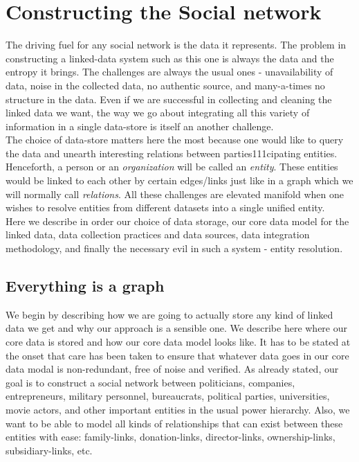 \chapter{Constructing the Social network}
The driving fuel for any social network is the data it represents. The problem in constructing a linked-data system such as this one is always the data and the entropy it brings. The challenges are always the usual ones - unavailability of data, noise in the collected data, no authentic source, and many-a-times no structure in the data. Even if we are successful in collecting and cleaning the linked data we want, the way we go about integrating all this variety of information in a single data-store is itself an another challenge. \\

The choice of data-store matters here the most because one would like to query the data and unearth interesting relations between parties111cipating entities. Henceforth, a person or an \emph{organization} will be called an \emph{entity}. These entities would be linked to each other by certain edges/links just like in a graph which we will normally call \emph{relations}. All these challenges are elevated manifold when one wishes to resolve entities from different datasets into a single unified entity. \\

Here we describe in order our choice of data storage, our core data model for the linked data, data collection practices and data sources, data integration methodology, and finally the necessary evil in such a system -  entity resolution. \\

\section{Everything is a graph}
\label{datamodel}
We begin by describing how we are going to actually store any kind of linked data we get and why our approach is a sensible one. We describe here where our core data is stored and how our core data model looks like. It has to be stated at the onset that care has been taken to ensure that
whatever data goes in our core data modal is non-redundant, free of noise and verified. As already stated, our goal is to construct a social network between politicians, companies, entrepreneurs, military personnel, bureaucrats, political parties, universities, movie actors, and other important entities in the usual power hierarchy. Also, we want to be able to model all kinds of relationships that can exist between these entities with ease: family-links, donation-links, director-links, ownership-links, subsidiary-links, etc. \\

